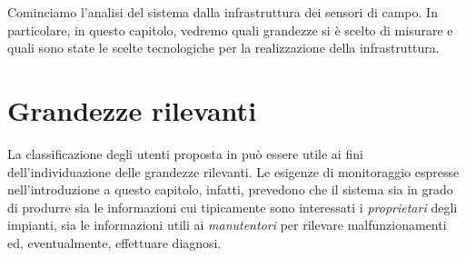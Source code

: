%
Cominciamo l'analisi del sistema dalla infrastruttura dei sensori di campo.
%
In particolare, in questo capitolo, vedremo quali grandezze si \`e scelto di misurare 
e quali sono state le scelte tecnologiche per la realizzazione della infrastruttura.
%

%
\section{Grandezze rilevanti}
\label{sec:grandezze-rilevanti}
%
La classificazione degli utenti proposta in \cite{kolodenny08} pu\`o essere utile ai 
fini dell'individuazione delle grandezze rilevanti. Le esigenze di monitoraggio 
espresse nell'introduzione a questo capitolo, infatti, prevedono che il sistema 
sia in grado di produrre sia le informazioni cui tipicamente sono interessati i 
\emph{proprietari} degli impianti, sia le informazioni utili ai \emph{manutentori} 
per rilevare malfunzionamenti ed, eventualmente, effettuare diagnosi.
%

